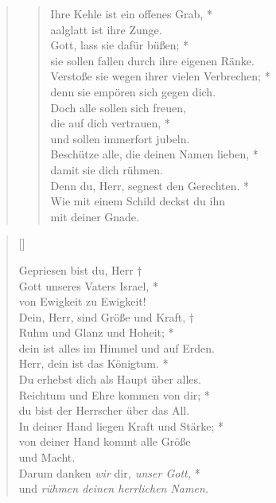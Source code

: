 \begin{quote}
\begin{verse}
Ihre Kehle ist ein offenes Grab, *\\  
aalglatt ist ihre Zunge.\\ 
\vin Gott, lass sie dafür büßen; *\\ 
\vin sie sollen fallen durch ihre eigenen Ränke.\\  
Verstoße sie wegen ihrer vielen Verbrechen; *\\  
denn sie empören sich gegen dich.\\ 
\vin Doch alle sollen sich freuen, \\ 
\vin die auf dich vertrauen, *\\ 
\vin und sollen immerfort jubeln.\\  
Beschütze alle, die deinen Namen lieben, *\\  
damit sie dich rühmen.\\ 
\vin Denn du, Herr, segnest den Gerechten. *\\ 
\vin Wie mit einem Schild deckst du ihn\\ 
\vin mit deiner Gnade.\\ 
\end{verse}
\end{quote}

\newpage

\def\greinitialformat#1{{\fontsize{40}{40}\selectfont #1}}
\gresetfirstlineaboveinitial{\small \textcolor{red}{1 Chr 29}}{}
\setaboveinitialseparation{0.72mm}



\begin{verse}[\versewidth]

Gepriesen bist du, Herr †\\
Gott unseres Vaters Israel, *\\
von Ewigkeit zu Ewigkeit!\\
\vin Dein, Herr, sind Größe und Kraft, †\\
\vin Ruhm und Glanz und Hoheit; *\\
dein ist alles im Himmel und auf Erden.\\
\vin Herr, dein ist das Königtum. *\\
\vin Du erhebst dich als Haupt über alles.\\
Reichtum und Ehre kommen von dir; *\\
du bist der Herrscher über das All.\\
\vin In deiner Hand liegen Kraft und Stärke; *\\
\vin von deiner Hand kommt alle Größe\\ 
\vin und Macht.\\
Darum danken \textit{wir} dir\textit{, unser Gott,} *\\
und \textit{rühmen deinen herrlichen Namen.}\\

\end{verse}


